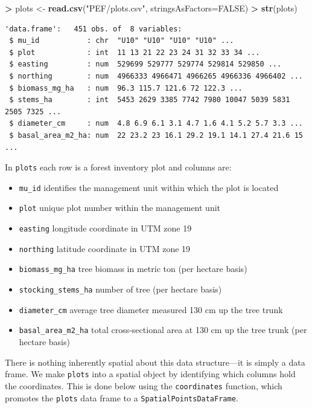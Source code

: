 \documentclass[]{krantz}
\makeatletter
\newenvironment{Shaded}{\begin{snugshade}}{\end{snugshade}}
\newcommand{\KeywordTok}[1]{\textcolor[rgb]{0.27,0.27,0.27}{\textbf{#1}}}
\newcommand{\DataTypeTok}[1]{\textcolor[rgb]{0.27,0.27,0.27}{#1}}
\newcommand{\StringTok}[1]{\textcolor[rgb]{0.5,0.5,0.5}{#1}}
\newcommand{\OtherTok}[1]{\textcolor[rgb]{0.37,0.37,0.37}{#1}}
\newcommand{\OperatorTok}[1]{\textcolor[rgb]{0.43,0.43,0.43}{\textbf{#1}}}
\newcommand{\NormalTok}[1]{#1}
\providecommand{\tightlist}{%
  \setlength{\itemsep}{0pt}\setlength{\parskip}{0pt}}
\newenvironment{kframe}{%
\medskip{}
\setlength{\fboxsep}{.8em}
 \def\at@end@of@kframe{}%
 \ifinner\ifhmode%
  \def\at@end@of@kframe{\end{minipage}}%
  \begin{minipage}{\columnwidth}%
 \fi\fi%
 \def\FrameCommand##1{\hskip\@totalleftmargin \hskip-\fboxsep
 \colorbox{shadecolor}{##1}\hskip-\fboxsep
     \hskip-\linewidth \hskip-\@totalleftmargin \hskip\columnwidth}%
 \MakeFramed {\advance\hsize-\width
   \@totalleftmargin\z@ \linewidth\hsize
   \@setminipage}}%
 {\par\unskip\endMakeFramed%
 \at@end@of@kframe}
\renewenvironment{Shaded}{\begin{kframe}}{\end{kframe}}
\makeatother
\begin{document}
\begin{Shaded}
\begin{Highlighting}[]
\OperatorTok{>}\StringTok{ }\NormalTok{plots <-}\StringTok{ }\KeywordTok{read.csv}\NormalTok{(}\StringTok{"PEF/plots.csv"}\NormalTok{, }\DataTypeTok{stringsAsFactors=}\OtherTok{FALSE}\NormalTok{)}
\OperatorTok{>}\StringTok{ }\KeywordTok{str}\NormalTok{(plots)}
\end{Highlighting}
\end{Shaded}

\begin{verbatim}
'data.frame':   451 obs. of  8 variables:
 $ mu_id           : chr  "U10" "U10" "U10" "U10" ...
 $ plot            : int  11 13 21 22 23 24 31 32 33 34 ...
 $ easting         : num  529699 529777 529774 529814 529850 ...
 $ northing        : num  4966333 4966471 4966265 4966336 4966402 ...
 $ biomass_mg_ha   : num  96.3 115.7 121.6 72 122.3 ...
 $ stems_ha        : int  5453 2629 3385 7742 7980 10047 5039 5831 2505 7325 ...
 $ diameter_cm     : num  4.8 6.9 6.1 3.1 4.7 1.6 4.1 5.2 5.7 3.3 ...
 $ basal_area_m2_ha: num  22 23.2 23 16.1 29.2 19.1 14.1 27.4 21.6 15 ...
\end{verbatim}

In \texttt{plots} each row is a forest inventory plot and columns are:

\begin{itemize}
\tightlist
\item
  \texttt{mu\_id} identifies the management unit within which the plot
  is located
\item
  \texttt{plot} unique plot number within the management unit
\item
  \texttt{easting} longitude coordinate in UTM zone 19
\item
  \texttt{northing} latitude coordinate in UTM zone 19
\item
  \texttt{biomass\_mg\_ha} tree biomass in metric ton (per hectare
  basis)
\item
  \texttt{stocking\_stems\_ha} number of tree (per hectare basis)
\item
  \texttt{diameter\_cm} average tree diameter measured 130 cm up the
  tree trunk
\item
  \texttt{basal\_area\_m2\_ha} total cross-sectional area at 130 cm up
  the tree trunk (per hectare basis)
\end{itemize}

There is nothing inherently spatial about this data structure---it is
simply a data frame. We make \texttt{plots} into a spatial object by
identifying which columns hold the coordinates. This is done below using
the \texttt{coordinates} function, which promotes the \texttt{plots}
data frame to a \texttt{SpatialPointsDataFrame}.
\end{document}
